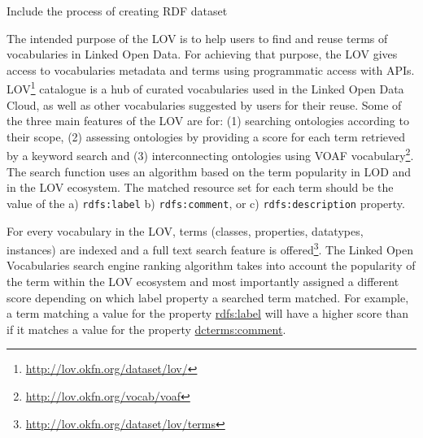Include the process of creating RDF dataset


The intended purpose of the LOV \cite{vandenbusschelov} is to help users to find and reuse terms of vocabularies in Linked Open Data. For achieving that purpose, the LOV gives access to vocabularies metadata and terms using programmatic access with APIs.  
LOV\footnote{\url{http://lov.okfn.org/dataset/lov/}} catalogue is a hub of curated vocabularies used in the Linked Open Data Cloud, as well as other vocabularies suggested by users for their reuse. 
Some of the three main features of the LOV are for: (1) searching ontologies according to their scope, (2) assessing ontologies by providing a score for each term retrieved by a keyword search and (3) interconnecting ontologies using VOAF vocabulary\footnote{\url{http://lov.okfn.org/vocab/voaf}}.
The search function uses an algorithm based on the term
popularity in LOD and in the LOV ecosystem. The matched resource set for each term should be the value of the a) {\tt rdfs:label} b) {\tt rdfs:comment}, or c) {\tt rdfs:description} property.

For every vocabulary in the LOV, terms (classes, properties, datatypes, instances) are indexed and a full text search feature is offered\footnote{\url{http://lov.okfn.org/dataset/lov/terms}}. The Linked Open Vocabularies search engine ranking algorithm takes into account the popularity of the term within the LOV ecosystem and most importantly assigned a different score depending on which label property a searched term matched. For example, a term matching a value for the property \url{rdfs:label} will have a higher score than if it matches a value for the property \url{dcterms:comment}.


